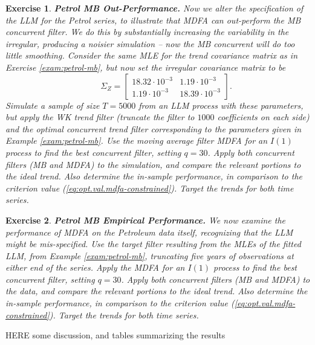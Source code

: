 \documentclass[a4paper]{book}
\newtheorem{Exercise}{Exercise}
\begin{document}
\begin{Exercise} {\bf Petrol MB Out-Performance.}  \rm
\label{exer:petrol-mb2}
 Now we alter the specification of the LLM for the Petrol series,
  to illustrate that MDFA can out-perform the MB concurrent filter.  
  We do this by substantially increasing the
 variability in the irregular, producing a noisier simulation -- now the MB concurrent will do too little smoothing.  Consider the same MLE for the trend covariance
  matrix as in Exercise \ref{exam:petrol-mb}, but now set the irregular
 covariance matrix to be
\[
   \qquad  \Sigma_{Z} = \left[ \begin{array}{ll}
       18.32 \cdot 10^{-3}  &  1.19 \cdot 10^{-3}   \\
       1.19 \cdot 10^{-3}  &  18.39 \cdot 10^{-3}  \end{array} \right].
\]
 Simulate a sample of size $T=5000$ from an LLM process with these parameters,
 but apply  the WK trend filter
(truncate the filter to $1000$ coefficients on each side) and the 
 optimal concurrent trend filter  corresponding to the parameters
  given in Example \ref{exam:petrol-mb}.  
 Use the moving average filter  MDFA  for an $I(1)$ process  to find the best
 concurrent filter, setting $q= 30$.
    Apply both concurrent filters (MB and MDFA)
 to the simulation, and compare the relevant portions to the ideal trend.
 Also determine the in-sample performance, in comparison to the criterion value
 (\ref{eq:opt.val.mdfa-constrained}).   Target the trends for both time series.
\end{Exercise}

\begin{Exercise} {\bf Petrol MB Empirical Performance.}  \rm
\label{exer:petrol-mb3}
 We now examine the performance of MDFA   on the Petroleum data itself,
 recognizing that the LLM might be mis-specified.  
 Use the target filter resulting from the MLEs of the fitted LLM,
  from Example \ref{exam:petrol-mb}, truncating five years of observations at either end
   of the series.  
 Apply the  MDFA  for an $I(1)$ process  to find the best
 concurrent filter, setting $q= 30$.
  Apply both concurrent filters (MB and MDFA)
 to the data, and compare the relevant portions to the ideal trend.
 Also determine the in-sample performance, in comparison to the criterion value
 (\ref{eq:opt.val.mdfa-constrained}).   Target the trends for both time series.
\end{Exercise}
    
   
HERE  some discussion, and tables summarizing the results    
   
\end{document}
